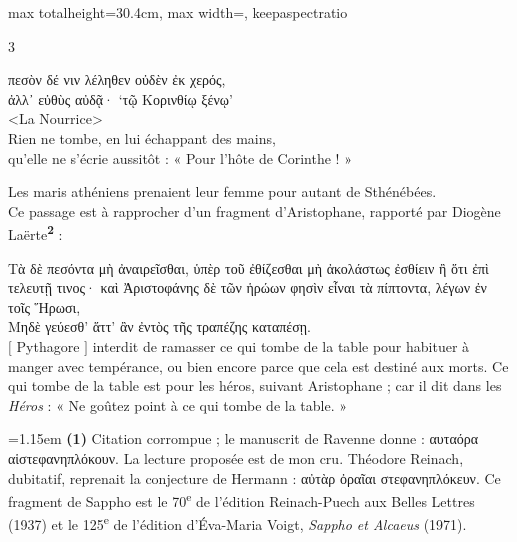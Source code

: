 \documentclass[11pt,twoside]{book}
\newcommand{\italique}[1]{\textit{#1}}
\newcommand{\citComm}[1]{\begin{quoting}[vskip=0.4pt,leftmargin=0.7em,rightmargin=0.2em]#1\end{quoting}}
\newcommand{\nieme}[1]{#1\textsuperscript{e}}
\newcommand{\francais}[1]{{\policeFr #1}}
\newcommand{\marqueur}[1]{\textsuperscript{\color{rubricRed}\textbf{#1}}}
\begin{document}
\begin{adjustbox}{max totalheight=30.4cm, max width=\textwidth, keepaspectratio}
\begin{minipage}{\textwidth}
{\begin{multicols}{3}
\citComm{πεσὸν δέ νιν λέληθεν οὐδὲν ἐκ χερός,\\
ἀλλ᾽ εὐθὺς αὐδᾷ· `τῷ Κορινθίῳ ξένῳ'\\
<La Nourrice>\\
\francais{Rien ne tombe, en lui échappant des mains,\\
qu'elle ne s'écrie aussitôt : « Pour l'hôte de Corinthe ! »}}
\par\vspace{1.5pt}
\noindent Les maris athéniens prenaient leur femme pour autant de Sthénébées.\\ Ce passage est à rapprocher d'un fragment d'Aristophane, rapporté par Diogène Laërte\marqueur{2} :
\citComm{Τὰ δὲ πεσόντα μὴ ἀναιρεῖσθαι, ὑπὲρ τοῦ ἐθίζεσθαι μὴ ἀκολάστως ἐσθίειν ἢ ὅτι ἐπὶ τελευτῇ τινος· καὶ Ἀριστοφάνης δὲ τῶν ἡρώων φησὶν εἶναι τὰ πίπτοντα, λέγων ἐν τοῖς Ἥρωσι,\\
Μηδὲ γεύεσθ' ἅττ' ἂν ἐντὸς τῆς τραπέζης καταπέσῃ.\\
$[$ Pythagore $]$ interdit de ramasser ce qui tombe de la table pour habituer à manger avec tempérance, ou bien encore parce que cela est destiné aux morts. Ce qui tombe de la table est pour les héros, suivant Aristophane ; car il dit dans les \italique{Héros} :
\francais{« Ne goûtez point à ce qui tombe de la table. »}}
\par\vspace{1.5pt}
\par\vspace{1.2pt}\par\nopagebreak\vspace{1pt}\noindent\hangindent=1.15em {\color{sepiaNote}\textbf{(1)}} Citation corrompue ; le manuscrit de Ravenne donne : αυταόρα αἱστεφανηπλόκουν. La lecture proposée est de mon cru. Théodore Reinach, dubitatif, reprenait la conjecture de Hermann : αὐτὰρ ὀραῖαι στεφανηπλόκευν. Ce fragment de Sappho est le \nieme{70} de l'édition Reinach-Puech aux Belles Lettres (1937) et le \nieme{125} de l'édition d'Éva-Maria Voigt, \italique{Sappho et Alcaeus} (1971).
\par\end{multicols}}
\end{minipage}\end{adjustbox}
\newpage
\end{document}
